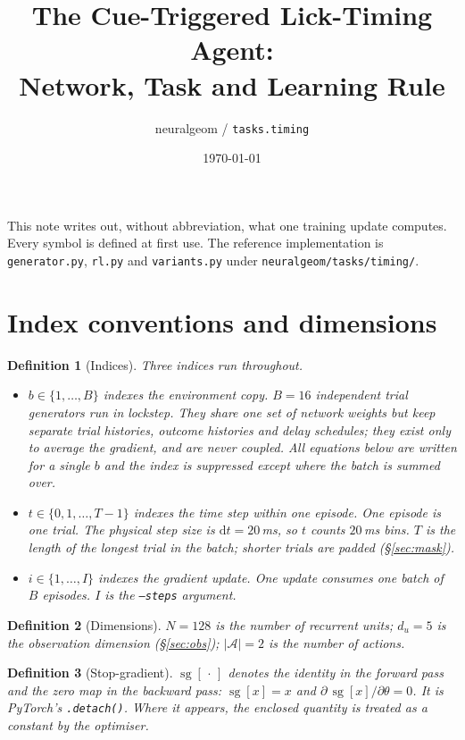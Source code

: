 \documentclass[11pt]{article}
\title{\bf The Cue-Triggered Lick-Timing Agent:\\ Network, Task and Learning Rule}
\author{neuralgeom / \texttt{tasks.timing}}
\date{\today}
\newtheorem{definition}{Definition}
\newcommand{\sg}{\operatorname{sg}}
\newcommand{\1}{\mathbf{1}}
\begin{document}
\maketitle

\noindent
This note writes out, without abbreviation, what one training update computes. Every
symbol is defined at first use. The reference implementation is
\texttt{generator.py}, \texttt{rl.py} and \texttt{variants.py} under
\texttt{neuralgeom/tasks/timing/}.

\tableofcontents

\section{Index conventions and dimensions}\label{sec:notation}

\begin{definition}[Indices]
Three indices run throughout.
\begin{itemize}
  \item $b \in \{1,\dots,B\}$ indexes the \emph{environment copy}. $B = 16$ independent
        trial generators run in lockstep. They share one set of network weights but keep
        separate trial histories, outcome histories and delay schedules; they exist only to
        average the gradient, and are never coupled. All equations below are written for a
        single $b$ and the index is suppressed except where the batch is summed over.
  \item $t \in \{0,1,\dots,T-1\}$ indexes the \emph{time step within one episode}. One
        episode is one trial. The physical step size is $\mathrm{d}t = 20$\,ms, so
        $t$ counts $20$\,ms bins. $T$ is the length of the longest trial in the batch;
        shorter trials are padded (\S\ref{sec:mask}).
  \item $i \in \{1,\dots,I\}$ indexes the \emph{gradient update}. One update consumes one
        batch of $B$ episodes. $I$ is the \texttt{--steps} argument.
\end{itemize}
\end{definition}

\begin{definition}[Dimensions]
$N = 128$ is the number of recurrent units; $d_u = 5$ is the observation dimension
(\S\ref{sec:obs}); $|\mathcal{A}| = 2$ is the number of actions.
\end{definition}

\begin{definition}[Stop-gradient]
$\sg[\,\cdot\,]$ denotes the identity in the forward pass and the zero map in the backward
pass: $\sg[x] = x$ and $\partial\,\sg[x]/\partial\theta = 0$. It is PyTorch's
\texttt{.detach()}. Where it appears, the enclosed quantity is treated as a constant by the
optimiser.
\end{definition}
\end{document}
